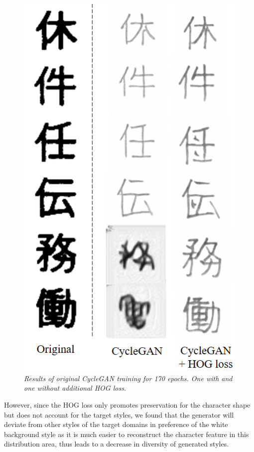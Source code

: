 \documentclass[12pt]{report}
\begin{document}
\begin{figure}[H]
	\centering
	\includegraphics[scale=0.9]{cycle-gan-result}
	\caption{\textit{Results of original CycleGAN training for 170 epochs. One with and one without additional HOG loss.}}
	\label{fig:cycle-gan-result}
\end{figure}

However, since the HOG loss only promotes preservation for the character shape but does not account for the target styles, we found that the generator will deviate from other styles of the target domains in preference of the white background style as it is much easier to reconstruct the character feature in this distribution area, thus leads to a decrease in diversity of generated styles.
 
\end{document}
